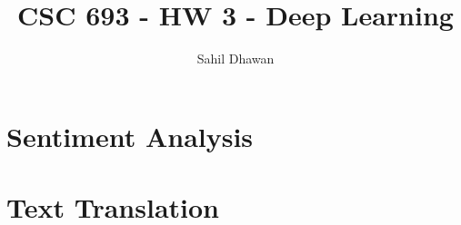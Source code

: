 \documentclass[conference]{IEEEtran}
\begin{document}
\onecolumn
\title{CSC 693 - HW 3 - Deep Learning}
\author{Sahil Dhawan}
\maketitle
\section{Sentiment Analysis}

\section{Text Translation}
\end{document}

